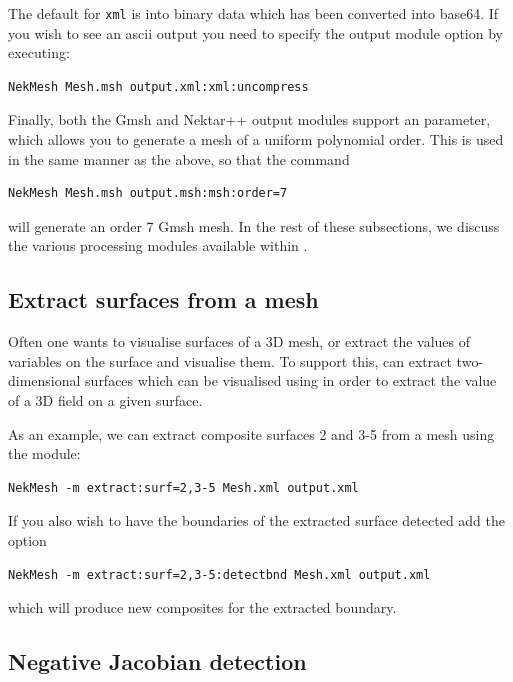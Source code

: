 The default for \texttt{xml} is into binary data which has been
converted into base64. If you wish to see an ascii output you need to
specify the output module option  by executing:
%
\begin{lstlisting}[style=BashInputStyle]
NekMesh Mesh.msh output.xml:xml:uncompress
\end{lstlisting}
%
Finally, both the Gmsh and Nektar++ output modules support an 
parameter, which allows you to generate a mesh of a uniform polynomial
order. This is used in the same manner as the above, so that the command
%
\begin{lstlisting}[style=BashInputStyle]
NekMesh Mesh.msh output.msh:msh:order=7
\end{lstlisting}
%
will generate an order 7 Gmsh mesh. In the rest of these subsections, we discuss
the various processing modules available within \mc.

\subsection{Extract surfaces from a mesh}
\label{s:utilities:nekmesh:extract}

Often one wants to visualise surfaces of a 3D mesh, or extract the values of
variables on the surface and visualise them. To support this, \mc can extract
two-dimensional surfaces which can be visualised using  in
order to extract the value of a 3D field on a given surface.

As an example, we can extract composite surfaces 2 and 3-5 from a mesh using the
 module:
%
\begin{lstlisting}[style=BashInputStyle]
NekMesh -m extract:surf=2,3-5 Mesh.xml output.xml
\end{lstlisting}
%
If you also wish to have the boundaries of the extracted surface detected add
the  option
%
\begin{lstlisting}[style=BashInputStyle]
NekMesh -m extract:surf=2,3-5:detectbnd Mesh.xml output.xml
\end{lstlisting}
which will produce new composites for the extracted boundary.

\subsection{Negative Jacobian detection}

